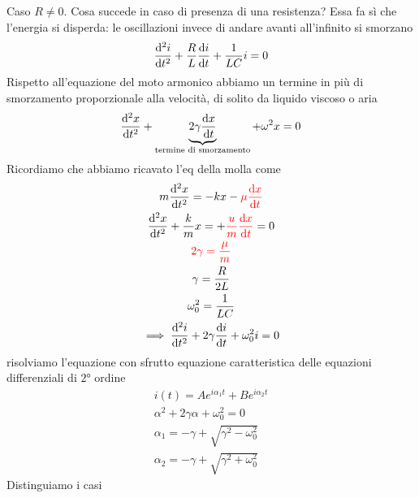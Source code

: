 Caso $R\neq 0$. Cosa succede in caso di presenza di una resistenza? Essa fa sì che l'energia si disperda: le oscillazioni invece di andare avanti all'infinito si smorzano
\begin{gather*}
	\dv[2]{i}{t}+\frac{R}{L}\dv{i}{t}+\frac{1}{LC}i=0
\end{gather*}
Rispetto all'equazione del moto armonico abbiamo un termine in più di smorzamento proporzionale alla velocità, di solito da liquido viscoso o aria
\begin{gather*}
	\dv[2]{x}{t}+\underbrace{2\gamma\dv{x}{t}}_{ \text{termine di smorzamento}} +\omega^2x=0
\end{gather*}
Ricordiamo che abbiamo ricavato l'eq della molla come 
\begin{gather*}
	m\dv[2]{x}{t}=-kx -\textcolor{red}{\mu\dv{x}{t}}\\
	\dv[2]{x}{t}+\frac{k}{m}x= +\textcolor{red}{\frac{u}{m}\dv{x}{t}}=0\\
	\textcolor{red}{2\gamma=\frac{\mu}{m}}\\
	\gamma=\frac{R}{2L}\\
	\omega_0^2=\frac{1}{LC}\\
	\implies \dv[2]{i}{t}+2\gamma\dv{i}{t}+\omega_0^2i=0
\end{gather*}
risolviamo l'equazione con
sfrutto equazione caratteristica delle equazioni differenziali di $2°$ ordine
\begin{gather*}
i(t)=Ae^{i\alpha_1 t}+Be^{i\alpha_2t}\\
\alpha^2 +2\gamma\alpha +\omega_0^2=0\\
\alpha_1=-\gamma+\sqrt{\gamma^2-\omega_0^2}\\
\alpha_2=-\gamma+\sqrt{\gamma^2+\omega_0^2}
\end{gather*}
Distinguiamo i casi
